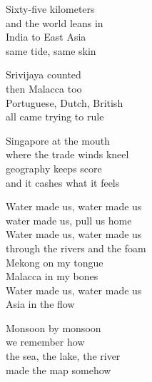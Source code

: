 \begin{lyrics}
Sixty-five kilometers\\
and the world leans in\\
India to East Asia\\
same tide, same skin

Srivijaya counted\\
then Malacca too\\
Portuguese, Dutch, British\\
all came trying to rule

Singapore at the mouth\\
where the trade winds kneel\\
geography keeps score\\
and it cashes what it feels

Water made us, water made us\\
water made us, pull us home\\
Water made us, water made us\\
through the rivers and the foam\\
Mekong on my tongue\\
Malacca in my bones\\
Water made us, water made us\\
Asia in the flow

Monsoon by monsoon\\
we remember how\\
the sea, the lake, the river\\
made the map somehow
\end{lyrics}


